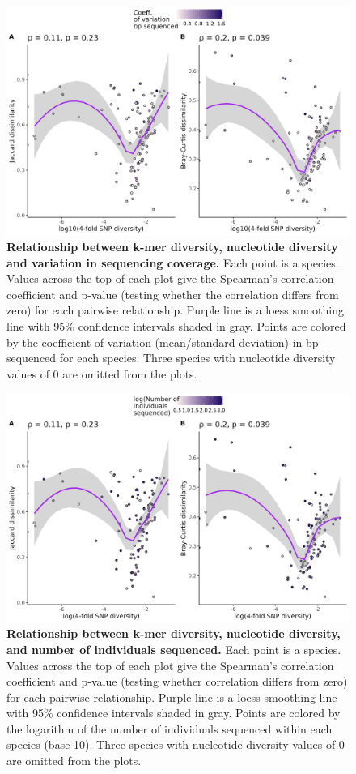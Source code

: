 \documentclass[12pt]{article}
\begin{document}
\begin{figure}[H]
    \centering
    \includegraphics[width=\textwidth]{figures/appendix_d/pi_vs_jac_and_bcd_cvbp_2024-12-12.jpg}
    \caption{\textbf{Relationship between k-mer diversity, nucleotide diversity and variation in sequencing coverage.} Each point is a species. Values across the top of each plot give the Spearman's correlation coefficient and p-value (testing whether the correlation differs from zero) for each pairwise relationship. Purple line is a loess smoothing line with 95\% confidence intervals shaded in gray. Points are colored by the coefficient of variation (mean/standard deviation) in bp sequenced for each species. Three species with nucleotide diversity values of 0 are omitted from the plots.}
\end{figure}

\begin{figure}[H]
    \centering
    \includegraphics[width=\textwidth]{figures/appendix_d/pi_vs_jac_and_bcd_nidv_2024-12-12.jpg}
    \caption{\textbf{Relationship between k-mer diversity, nucleotide diversity, and number of individuals sequenced.} Each point is a species. Values across the top of each plot give the Spearman's correlation coefficient and p-value (testing whether correlation differs from zero) for each pairwise relationship. Purple line is a loess smoothing line with 95\% confidence intervals shaded in gray. Points are colored by the logarithm of the number of individuals sequenced within each species (base 10). Three species with nucleotide diversity values of 0 are omitted from the plots.}
\end{figure}
\end{document}
